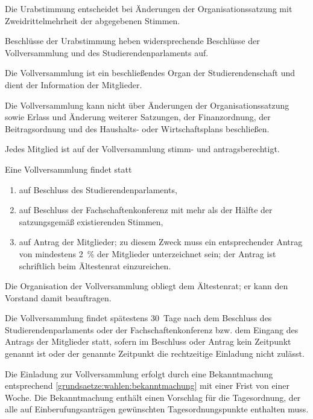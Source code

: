 \begin{jurdoc}
Die Urabstimmung entscheidet bei Änderungen der Organisationssatzung mit Zweidrittelmehrheit der abgegebenen Stimmen.

Beschlüsse der Urabstimmung heben widersprechende Beschlüsse der Vollversammlung und des Studierendenparlaments auf.

%
%



Die Vollversammlung ist ein beschließendes Organ der Studierendenschaft und dient der Information der Mitglieder.

Die Vollversammlung kann nicht über Änderungen der Organisationssatzung sowie Erlass und Änderung weiterer Satzungen, der Finanzordnung, der Beitragsordnung und des Haushalts- oder Wirtschaftsplans beschließen.


Jedes Mitglied ist auf der Vollversammlung stimm- und antragsberechtigt.

 \label{vv:zustandekommen}

Eine Vollversammlung findet statt
\begin{enumerate}
\item auf Beschluss des Studierendenparlaments,
\item auf Beschluss der Fachschaftenkonferenz mit mehr als der Hälfte der satzungsgemäß existierenden Stimmen,
\item \label{vv:zustandekommen:mitglieder}auf Antrag der Mitglieder; zu diesem Zweck muss ein entsprechender Antrag von mindestens 2~\% der Mitglieder unterzeichnet sein; der Antrag ist schriftlich beim Ältestenrat einzureichen.
\end{enumerate}


\label{vv:organisation}

Die Organisation der Vollversammlung obliegt dem Ältestenrat; er kann den Vorstand damit beauftragen.

Die Vollversammlung findet spätestens 30~Tage nach dem Beschluss des Studierendenparlaments oder der Fachschaftenkonferenz bzw. dem Eingang des Antrags der Mitglieder statt, sofern im Beschluss oder Antrag kein Zeitpunkt genannt ist oder der genannte Zeitpunkt die rechtzeitige Einladung nicht zulässt.

Die Einladung zur Vollversammlung erfolgt durch eine Bekanntmachung entsprechend \ref{grundsaetze:wahlen:bekanntmachung} mit einer Frist von einer Woche. Die Bekanntmachung enthält einen Vorschlag für die Tagesordnung, der alle auf Einberufungsanträgen gewünschten Tagesordnungspunkte enthalten muss.


\end{jurdoc}
